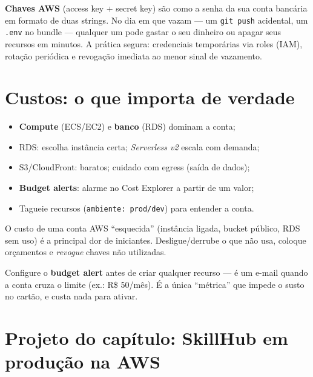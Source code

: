 \begin{caixaconceito}
\textbf{Chaves AWS} (access key + secret key) são como a senha da sua conta
bancária em formato de duas strings. No dia em que vazam — um \texttt{git
push} acidental, um \texttt{.env} no bundle — qualquer um pode gastar o seu
dinheiro ou apagar seus recursos em minutos. A prática segura: credenciais
temporárias via roles (IAM), rotação periódica e revogação imediata ao menor
sinal de vazamento.
\end{caixaconceito}

\section{Custos: o que importa de verdade}

\begin{itemize}[leftmargin=*, itemsep=0.4em]
  \item \textbf{Compute} (ECS/EC2) e \textbf{banco} (RDS) dominam a conta;
  \item RDS: escolha instância certa; \emph{Serverless v2} escala com demanda;
  \item S3/CloudFront: baratos; cuidado com egress (saída de dados);
  \item \textbf{Budget alerts}: alarme no Cost Explorer a partir de um valor;
  \item Tagueie recursos (\texttt{ambiente: prod/dev}) para entender a conta.
\end{itemize}

\begin{caixaarmadilha}
O custo de uma conta AWS ``esquecida'' (instância ligada, bucket público, RDS
sem uso) é a principal dor de iniciantes. Desligue/derrube o que não usa,
coloque orçamentos e \emph{revogue} chaves não utilizadas.
\end{caixaarmadilha}

\begin{caixadica}
Configure o \textbf{budget alert} antes de criar qualquer recurso — é um
e-mail quando a conta cruza o limite (ex.: R\$ 50/mês). É a única ``métrica''
que impede o susto no cartão, e custa nada para ativar.
\end{caixadica}

\section{Projeto do capítulo: SkillHub em produção na AWS}
\label{sec:projeto23}

